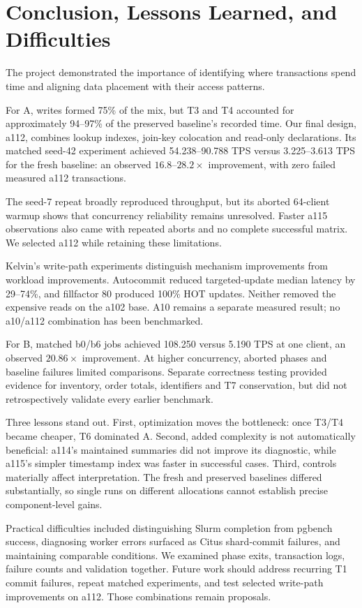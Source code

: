 \section{Conclusion, Lessons Learned, and Difficulties}
\label{sec:conclusion}

The project demonstrated the importance of identifying where transactions
spend time and aligning data placement with their access patterns.

For A, writes formed 75\% of the mix, but T3 and T4 accounted for approximately
94--97\% of the preserved baseline's recorded time. Our final design, a112,
combines lookup indexes, join-key colocation and read-only declarations.
Its matched seed-42 experiment achieved 54.238--90.788 TPS versus
3.225--3.613 TPS for the fresh baseline: an observed $16.8$--$28.2\times$
improvement, with zero failed measured a112 transactions.

The seed-7 repeat broadly reproduced throughput, but its aborted 64-client
warmup shows that concurrency reliability remains unresolved. Faster a115
observations also came with repeated aborts and no complete successful matrix.
We selected a112 while retaining these limitations.

Kelvin's write-path experiments distinguish mechanism improvements from
workload improvements. Autocommit reduced targeted-update median latency by
29--74\%, and fillfactor 80 produced 100\% HOT updates. Neither removed the
expensive reads on the a102 base. A10 remains a separate measured result;
no a10/a112 combination has been benchmarked.

For B, matched b0/b6 jobs achieved 108.250 versus 5.190 TPS at one client,
an observed $20.86\times$ improvement. At higher concurrency, aborted phases
and baseline failures limited comparisons. Separate correctness testing
provided evidence for inventory, order totals, identifiers and T7 conservation,
but did not retrospectively validate every earlier benchmark.

Three lessons stand out. First, optimization moves the bottleneck: once T3/T4
became cheaper, T6 dominated A. Second, added complexity is not automatically
beneficial: a114's maintained summaries did not improve its diagnostic,
while a115's simpler timestamp index was faster in successful cases.
Third, controls materially affect interpretation. The fresh and preserved
baselines differed substantially, so single runs on different allocations
cannot establish precise component-level gains.

Practical difficulties included distinguishing Slurm completion from pgbench
success, diagnosing worker errors surfaced as Citus shard-commit failures,
and maintaining comparable conditions. We examined phase exits, transaction
logs, failure counts and validation together. Future work should address
recurring T1 commit failures, repeat matched experiments, and test selected
write-path improvements on a112. Those combinations remain proposals.
